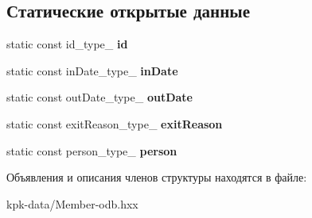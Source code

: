 \subsection*{Статические открытые данные}
\begin{DoxyCompactItemize}
\item 
static const id\+\_\+type\+\_\+ {\bfseries id}\hypertarget{structodb_1_1pointer__query__columns_3_01_1_1kpk_1_1data_1_1_member_00_01id__pgsql_00_01_a_01_4_a6436d7341f59c29a6c977d7c6a0d9684}{}\label{structodb_1_1pointer__query__columns_3_01_1_1kpk_1_1data_1_1_member_00_01id__pgsql_00_01_a_01_4_a6436d7341f59c29a6c977d7c6a0d9684}

\item 
static const in\+Date\+\_\+type\+\_\+ {\bfseries in\+Date}\hypertarget{structodb_1_1pointer__query__columns_3_01_1_1kpk_1_1data_1_1_member_00_01id__pgsql_00_01_a_01_4_aac351a1f5f7f52d006ad978e6bbce3c3}{}\label{structodb_1_1pointer__query__columns_3_01_1_1kpk_1_1data_1_1_member_00_01id__pgsql_00_01_a_01_4_aac351a1f5f7f52d006ad978e6bbce3c3}

\item 
static const out\+Date\+\_\+type\+\_\+ {\bfseries out\+Date}\hypertarget{structodb_1_1pointer__query__columns_3_01_1_1kpk_1_1data_1_1_member_00_01id__pgsql_00_01_a_01_4_a2f68c664216e7e4b05a6225156cadfba}{}\label{structodb_1_1pointer__query__columns_3_01_1_1kpk_1_1data_1_1_member_00_01id__pgsql_00_01_a_01_4_a2f68c664216e7e4b05a6225156cadfba}

\item 
static const exit\+Reason\+\_\+type\+\_\+ {\bfseries exit\+Reason}\hypertarget{structodb_1_1pointer__query__columns_3_01_1_1kpk_1_1data_1_1_member_00_01id__pgsql_00_01_a_01_4_a1d6d36a64f33fa99c6f4e56f7c18a09e}{}\label{structodb_1_1pointer__query__columns_3_01_1_1kpk_1_1data_1_1_member_00_01id__pgsql_00_01_a_01_4_a1d6d36a64f33fa99c6f4e56f7c18a09e}

\item 
static const person\+\_\+type\+\_\+ {\bfseries person}\hypertarget{structodb_1_1pointer__query__columns_3_01_1_1kpk_1_1data_1_1_member_00_01id__pgsql_00_01_a_01_4_ad9ac05d4ca070f0aa563c42100bc8c94}{}\label{structodb_1_1pointer__query__columns_3_01_1_1kpk_1_1data_1_1_member_00_01id__pgsql_00_01_a_01_4_ad9ac05d4ca070f0aa563c42100bc8c94}

\end{DoxyCompactItemize}


Объявления и описания членов структуры находятся в файле\+:\begin{DoxyCompactItemize}
\item 
kpk-\/data/Member-\/odb.\+hxx\end{DoxyCompactItemize}
